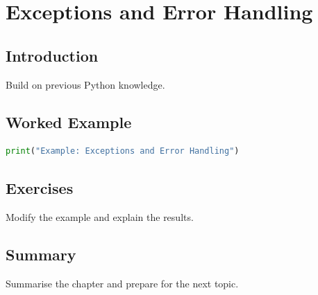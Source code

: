 \chapter{Exceptions and Error Handling}
\label{chap:vol3-10}


\section{Introduction}
Build on previous Python knowledge.

\section{Worked Example}
\begin{lstlisting}[language=Python]
print("Example: Exceptions and Error Handling")
\end{lstlisting}

\section{Exercises}
\begin{exercise}
Modify the example and explain the results.
\end{exercise}

\section{Summary}
Summarise the chapter and prepare for the next topic.

